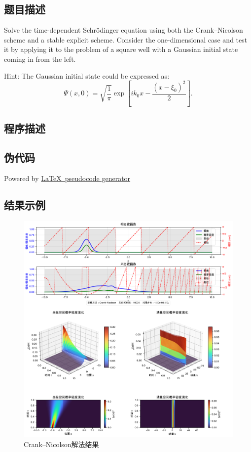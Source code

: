 \subsection{题目描述}
\noindent
Solve the time-dependent Schrödinger equation using both the Crank–Nicolson scheme and a stable explicit scheme. Consider the one-dimensional case and test it by applying it to the problem of a square well with a Gaussian initial state coming in from the left.

\noindent
Hint: The Gaussian initial state could be expressed as:
\[
    \Psi(x, 0) = \sqrt{\frac{1}{\pi}} \exp\left[ i k_0 x - \frac{(x - \xi_0)^2}{2} \right].
\]


\subsection{程序描述}

\subsection{伪代码}
Powered by \href{https://chatgpt.com/g/g-xJJAA2awf-latex-pseudocode-generator}{\LaTeX \ pseudocode generator}


\subsection{结果示例}
\begin{figure}[H]
    \centering
    \includegraphics[width=1.0\textwidth]{Problem_2/figs/cn_result.png}
    \caption{Crank–Nicolson解法结果}
\end{figure}

